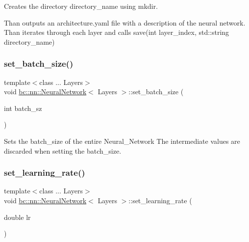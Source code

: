 Creates the directory {\ttfamily directory\+\_\+name} using mkdir. 

Than outputs an architecture.\+yaml file with a description of the neural network. Than iterates through each layer and calls \textquotesingle{}save(int layer\+\_\+index, std\+::string directory\+\_\+name)\textquotesingle{} \mbox{\label{structbc_1_1nn_1_1NeuralNetwork_a571b56d5df7236d38614b7cedaeb43ab}} 
\subsubsection{\texorpdfstring{set\+\_\+batch\+\_\+size()}{set\_batch\_size()}}
{\footnotesize\ttfamily template$<$class ... Layers$>$ \\
void \hyperlink{structbc_1_1nn_1_1NeuralNetwork}{bc\+::nn\+::\+Neural\+Network}$<$ Layers $>$\+::set\+\_\+batch\+\_\+size (\begin{DoxyParamCaption}\item[{int}]{batch\+\_\+sz }\end{DoxyParamCaption})\hspace{0.3cm}{\ttfamily [inline]}}



Sets the batch\+\_\+size of the entire Neural\+\_\+\+Network The intermediate values are discarded when setting the batch\+\_\+size. 

\mbox{\label{structbc_1_1nn_1_1NeuralNetwork_ab8b712ee3726a715990a22b392e07147}} 
\subsubsection{\texorpdfstring{set\+\_\+learning\+\_\+rate()}{set\_learning\_rate()}}
{\footnotesize\ttfamily template$<$class ... Layers$>$ \\
void \hyperlink{structbc_1_1nn_1_1NeuralNetwork}{bc\+::nn\+::\+Neural\+Network}$<$ Layers $>$\+::set\+\_\+learning\+\_\+rate (\begin{DoxyParamCaption}\item[{double}]{lr }\end{DoxyParamCaption})\hspace{0.3cm}{\ttfamily [inline]}}



